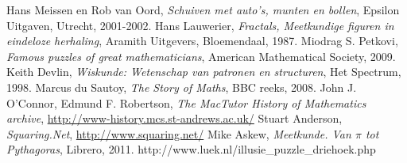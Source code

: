 
\begin{thebibliography}{8}
\label{1} Hans Meissen en Rob van Oord, \textit{Schuiven met auto's, munten en bollen}, Epsilon Uitgaven, Utrecht, 2001-2002.
\label{2} Hans Lauwerier, \textit{Fractals, Meetkundige figuren in eindeloze herhaling}, Aramith Uitgevers, Bloemendaal, 1987.
\label{3} Miodrag S. Petkovi, \textit{Famous puzzles of great mathematicians}, American Mathematical Society, 2009.
\label{4} Keith Devlin, \textit{Wiskunde: Wetenschap van patronen en structuren}, Het Spectrum, 1998.
\label{5} Marcus du Sautoy, \textit{The Story of Maths}, BBC reeks, 2008.
\label{6} John J. O'Connor, Edmund F. Robertson, \textit{The MacTutor History of Mathematics archive}, \url{http://www-history.mcs.st-andrews.ac.uk/}
\label{7} Stuart Anderson, \textit{Squaring.Net}, \url{http://www.squaring.net/}
\label{8} Mike Askew, \textit{Meetkunde. Van $\pi$ tot Pythagoras}, Librero, 2011.
\label{9} http://www.luek.nl/illusie\_puzzle\_driehoek.php
\end{thebibliography}

